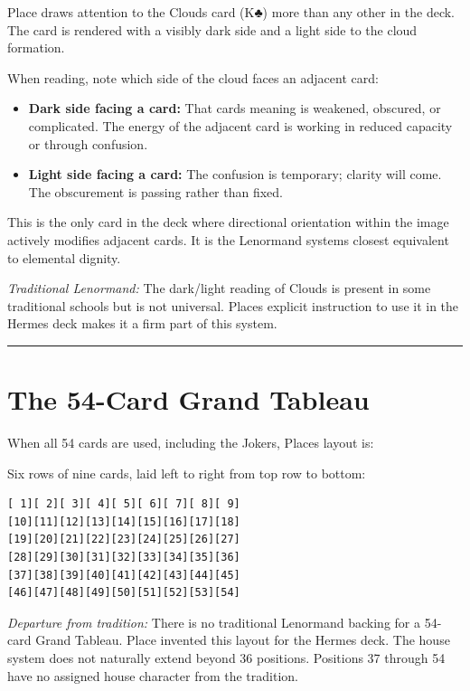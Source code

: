Place draws attention to the Clouds card (K♣) more than any other in the deck. The card is rendered with a visibly dark side and a light side to the cloud formation.

When reading, note which side of the cloud faces an adjacent card:

\begin{itemize}
\tightlist
\item
  \textbf{Dark side facing a card:} That card\textquotesingle s meaning is weakened, obscured, or complicated. The energy of the adjacent card is working in reduced capacity or through confusion.
\item
  \textbf{Light side facing a card:} The confusion is temporary; clarity will come. The obscurement is passing rather than fixed.
\end{itemize}

This is the only card in the deck where directional orientation within the image actively modifies adjacent cards. It is the Lenormand system\textquotesingle s closest equivalent to elemental dignity.

\emph{Traditional Lenormand:} The dark/light reading of Clouds is present in some traditional schools but is not universal. Place\textquotesingle s explicit instruction to use it in the Hermes deck makes it a firm part of this system.

\begin{center}\rule{0.5\linewidth}{0.5pt}\end{center}

\section{The 54-Card Grand Tableau}\label{the-54-card-grand-tableau}

When all 54 cards are used, including the Jokers, Place\textquotesingle s layout is:

Six rows of nine cards, laid left to right from top row to bottom:

\begin{verbatim}
[ 1][ 2][ 3][ 4][ 5][ 6][ 7][ 8][ 9]
[10][11][12][13][14][15][16][17][18]
[19][20][21][22][23][24][25][26][27]
[28][29][30][31][32][33][34][35][36]
[37][38][39][40][41][42][43][44][45]
[46][47][48][49][50][51][52][53][54]
\end{verbatim}

\emph{Departure from tradition:} There is no traditional Lenormand backing for a 54-card Grand Tableau. Place invented this layout for the Hermes deck. The house system does not naturally extend beyond 36 positions. Positions 37 through 54 have no assigned house character from the tradition.

